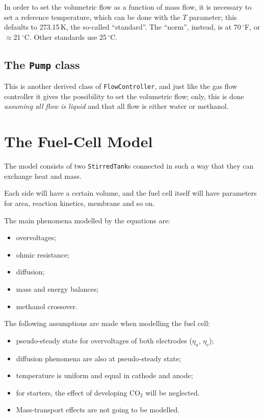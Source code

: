 \documentclass[a4paper]{article}
\newcommand{\textdegree}{\ensuremath{^{\circ}}}
\begin{document}
In order to set the volumetric flow as a function of mass flow, it is necessary
to set a reference temperature, which can be done with the $T$ parameter; this
defaults to 273.15\,K, the so-called ``standard''. The ``norm'', instead, is at
70\,\textdegree F, or $\approx$21\,\textdegree C. Other standards use
25\,\textdegree C.


\subsection{The \texttt{Pump} class}
This is another derived class of \texttt{FlowController}, and just like the gas
flow controller it gives the possibility to set the volumetric flow;
only, this is done \emph{assuming all flow is liquid} and that all flow is
either water or methanol.

\section{The Fuel-Cell Model}

The model consists of two \texttt{StirredTank}s connected in such a way that
they can exchange heat and mass.

Each side will have a certain volume, and the fuel cell itself will have
parameters for area, reaction kinetics, membrane and so on.

The main phenomena modelled by the equations are:
\begin{itemize}
\item overvoltages;
\item ohmic resistance;
\item diffusion;
\item mass and energy balances;
\item methanol crossover.
\end{itemize}

The following assumptions are made when modelling the fuel cell:

\begin{itemize}
\item pseudo-steady state for overvoltages of both electrodes ($\eta_a$,
$\eta_c$);
\item diffusion phenomena are also at pseudo-steady state;
\item temperature is uniform and equal in cathode and anode;
\item for starters, the effect of developing CO$_2$ will be neglected.
\item Mass-transport effects are not going to be modelled.
\end{itemize}
\end{document}
